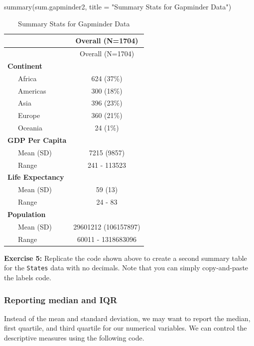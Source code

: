 \documentclass[
]{book}
\makeatletter
\newenvironment{Shaded}{\begin{snugshade}}{\end{snugshade}}
\newcommand{\AttributeTok}[1]{\textcolor[rgb]{0.61,0.61,0.61}{#1}}
\newcommand{\FunctionTok}[1]{\textcolor[rgb]{0,0,0}{#1}}
\newcommand{\NormalTok}[1]{#1}
\newcommand{\StringTok}[1]{\textcolor[rgb]{0.5,0.5,0.5}{#1}}
\newenvironment{kframe}{%
\medskip{}
\setlength{\fboxsep}{.8em}
 \def\at@end@of@kframe{}%
 \ifinner\ifhmode%
  \def\at@end@of@kframe{\end{minipage}}%
  \begin{minipage}{\columnwidth}%
 \fi\fi%
 \def\FrameCommand##1{\hskip\@totalleftmargin \hskip-\fboxsep
 \colorbox{shadecolor}{##1}\hskip-\fboxsep
     \hskip-\linewidth \hskip-\@totalleftmargin \hskip\columnwidth}%
 \MakeFramed {\advance\hsize-\width
   \@totalleftmargin\z@ \linewidth\hsize
   \@setminipage}}%
 {\par\unskip\endMakeFramed%
 \at@end@of@kframe}
\renewenvironment{Shaded}{\begin{kframe}}{\end{kframe}}
\newenvironment{rmdblock}[1]
  {\begin{shaded*}
  }
  {\end{shaded*}
  }
\newenvironment{learncheck}
  {\begin{rmdblock}{warning}}
  {\end{rmdblock}}
\makeatother
\begin{document}
\begin{Shaded}
\begin{Highlighting}[]
\FunctionTok{summary}\NormalTok{(sum.gapminder2, }\AttributeTok{title =} \StringTok{"Summary Stats for Gapminder Data"}\NormalTok{)}
\end{Highlighting}
\end{Shaded}

\begin{longtable}[]{@{}lc@{}}
\caption{Summary Stats for Gapminder Data}\tabularnewline
\toprule
& Overall (N=1704) \\
\midrule
\endfirsthead
\toprule
& Overall (N=1704) \\
\midrule
\endhead
\textbf{Continent} & \\
~~~Africa & 624 (37\%) \\
~~~Americas & 300 (18\%) \\
~~~Asia & 396 (23\%) \\
~~~Europe & 360 (21\%) \\
~~~Oceania & 24 (1\%) \\
\textbf{GDP Per Capita} & \\
~~~Mean (SD) & 7215 (9857) \\
~~~Range & 241 - 113523 \\
\textbf{Life Expectancy} & \\
~~~Mean (SD) & 59 (13) \\
~~~Range & 24 - 83 \\
\textbf{Population} & \\
~~~Mean (SD) & 29601212 (106157897) \\
~~~Range & 60011 - 1318683096 \\
\bottomrule
\end{longtable}

\begin{learncheck}
\textbf{Exercise 5:} Replicate the code shown above to create a second
summary table for the \texttt{States} data with no decimals. Note that
you can simply copy-and-paste the labels code.
\end{learncheck}

\hypertarget{reporting-median-and-iqr}{%
\subsubsection{Reporting median and IQR}\label{reporting-median-and-iqr}}

Instead of the mean and standard deviation, we may want to report the median, first quartile, and third quartile for our numerical variables. We can control the descriptive measures using the following code.
\end{document}
